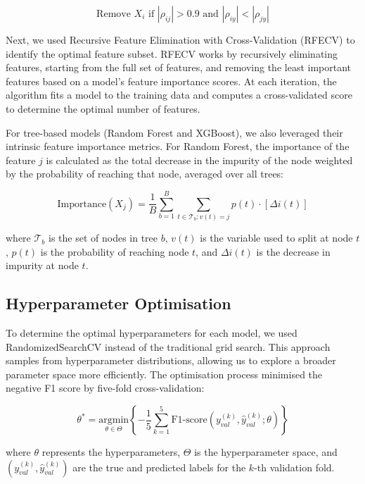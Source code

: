 \begin{equation}
    \text{Remove } X_i \text{ if } |\rho_{ij}| > 0.9 \text{ and } |\rho_{iy}| < |\rho_{jy}|
\end{equation}

Next, we used Recursive Feature Elimination with Cross-Validation (RFECV) to identify the optimal feature subset. RFECV works by recursively eliminating features, starting from the full set of features, and removing the least important features based on a model's feature importance scores. At each iteration, the algorithm fits a model to the training data and computes a cross-validated score to determine the optimal number of features.

For tree-based models (Random Forest and XGBoost), we also leveraged their intrinsic feature importance metrics. For Random Forest, the importance of the feature $j$ is calculated as the total decrease in the impurity of the node weighted by the probability of reaching that node, averaged over all trees:

\begin{equation}
    \text{Importance}(X_j) = \frac{1}{B} \sum_{b=1}^{B} \sum_{t \in \mathcal{T}_b: v(t)=j} p(t) \cdot [\Delta i(t)]
\end{equation}

where $\mathcal{T}_b$ is the set of nodes in tree $b$, $v(t)$ is the variable used to split at node $t$, $p(t)$ is the probability of reaching node $t$, and $\Delta i(t)$ is the decrease in impurity at node $t$.

\subsection{Hyperparameter Optimisation}

To determine the optimal hyperparameters for each model, we used RandomizedSearchCV instead of the traditional grid search. This approach samples from hyperparameter distributions, allowing us to explore a broader parameter space more efficiently. The optimisation process minimised the negative F1 score by five-fold cross-validation:

\begin{equation}
    \theta^* = \underset{\theta \in \Theta}{\text{argmin}} \left\{ -\frac{1}{5} \sum_{k=1}^{5} \text{F1-score}(y_{val}^{(k)}, \hat{y}_{val}^{(k)}; \theta) \right\}
\end{equation}

where $\theta$ represents the hyperparameters, $\Theta$ is the hyperparameter space, and $(y_{val}^{(k)}, \hat{y}_{val}^{(k)})$ are the true and predicted labels for the $k$-th validation fold.

